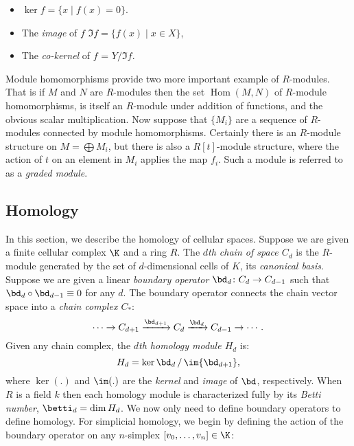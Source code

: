 \begin{itemize}
\item $\ker{f} = \{ x \mid f(x) = 0 \}$. 
\item The \emph{image} of $f$ $\Im{f} = \{ f(x) \mid x \in X\}$, 
\item The \emph{co-kernel} of $f$ = $Y/\Im{f}$.
\end{itemize}
Module homomorphisms provide two more important example of $R$-modules. That is if $M$ and $N$ are $R$-modules then the set $\operatorname{Hom}(M,N)$ of $R$-module homomorphisms, is itself an $R$-module under addition of functions, and the obvious scalar multiplication. Now suppose that $\{M_i\}$ are a sequence of $R$-modules connected by module homomorphisms. Certainly there is an $R$-module structure on $M = \bigoplus M_i$, but there is also a $R[t]$-module structure, where the action of $t$ on an element in $M_i$ applies the map $f_i$. Such a module is referred to as a \emph{graded module}.

\subsection{Homology}
In this section, we describe the homology of cellular spaces. 
Suppose we are given a finite cellular complex $\K$ and a ring $R$. 
The \emph{$d$th chain of space $C_d$} is the $R$-module generated by 
the set of $d$-dimensional cells of $K$, its \emph{canonical basis}.  
Suppose we are given a linear \emph{boundary operator} 
$\bd_d\colon C_d \rightarrow C_{d-1}$ such that 
$\bd_d \circ \bd_{d-1} \equiv 0$ for any $d$.  
The boundary operator connects the chain vector space into a 
\emph{chain complex $C_*$}:
\begin{equation*}
  \cdots \rightarrow             C_{d+1}
         \xrightarrow{\bd_{d+1}}  C_d
         \xrightarrow{\bd_d}     C_{d-1}
         \rightarrow \cdots .
\label{eqn:chaincomplex}
\end{equation*}
Given any chain complex, the \emph{$d$th homology module $H_d$} is:
\begin{equation}
  \label{eqn:homology}
  H_d = {\ker{\bd_d}}\,/\,{\im{\bd_{d+1}}}, 
\end{equation}
where $\ker(.)$ and $\im(.)$ are the \emph{kernel} and \emph{image} of $\bd$, 
respectively.
When $R$ is a field $k$ then each homology module is characterized fully by its \emph{Betti number}, 
$\betti_d = \dim{H_d}$. 
We now only need to define boundary operators to define homology. 
For simplicial homology, we begin by defining the action of the boundary operator on any
$n$-simplex $[v_0,\ldots,v_n] \in \K$:

